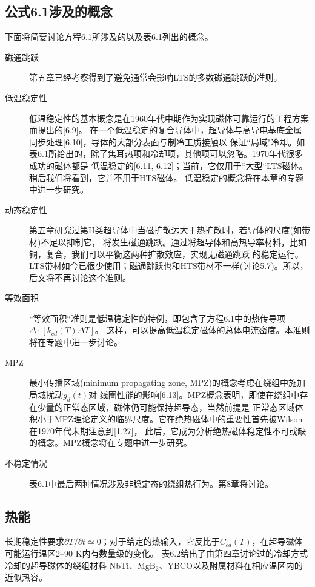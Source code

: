 \subsection{公式6.1涉及的概念}
下面将简要讨论方程6.1所涉及的以及表6.1列出的概念。
\begin{description}
  \item[磁通跳跃] 第五章已经考察得到了避免通常会影响LTS的多数磁通跳跃的准则。
  \item[低温稳定性] 低温稳定性的基本概念是在1960年代中期作为实现磁体可靠运行的工程方案而提出的[6.9]。
  在一个低温稳定的复合导体中，超导体与高导电基底金属同步处理[6.10]，导体的大部分表面与制冷工质接触以
  保证``局域"冷却。如表6.1所给出的，除了焦耳热项和冷却项，其他项可以忽略。1970年代很多成功的磁体都是
  低温稳定的[6.11, 6.12]；当前，它仅用于``大型``LTS磁体。稍后我们将看到，它并不用于HTS磁体。
  低温稳定的概念将在本章的专题中进一步研究。
  \item[动态稳定性] 第五章研究过第II类超导体中当磁扩散远大于热扩散时，若导体的尺度(如带材)不足以抑制它，
  将发生磁通跳跃。通过将超导体和高热导率材料，比如铜，复合，我们可以平衡这两种扩散效应，实现无磁通跳跃
  的稳定运行。LTS带材如今已很少使用；磁通跳跃也和HTS带材不一样(讨论5.7)。所以，后文将不再讨论这个准则。
  \item[等效面积] ``等效面积``准则是低温稳定性的特例，即包含了方程6.1中的热传导项$\Delta\cdot[k_{cd}(T)\Delta T]$。
  这样，可以提高低温稳定磁体的总体电流密度。本准则将在专题中进一步讨论。
  \item[MPZ] 最小传播区域(minimum propagating zone, MPZ)的概念考虑在绕组中施加局域扰动$g_d(t)$对
  线圈性能的影响[6.13]。MPZ概念表明，即使在绕组中存在少量的正常态区域，磁体仍可能保持超导态，当然前提是
  正常态区域体积小于MPZ理论定义的临界尺度。它在绝热磁体中的重要性首先被Wilson在1970年代末期注意到[1.27]，
  此后，它成为分析绝热磁体稳定性不可或缺的概念。MPZ概念将在专题中进一步研究。  
  \item[不稳定情况] 表6.1中最后两种情况涉及非稳定态的绕组热行为。第8章将讨论。
\end{description}

\subsection{热能}
长期稳定性要求$\partial T/\partial t\simeq 0$；对于给定的热输入，它反比于$C_{cd}(T)$，在超导磁体
可能运行温区2--90 K内有数量级的变化。
表6.2给出了由第四章讨论过的冷却方式冷却的超导磁体的绕组材料
NbTi、$\mathrm{MgB_2}$、YBCO以及附属材料在相应温区内的近似热容。

